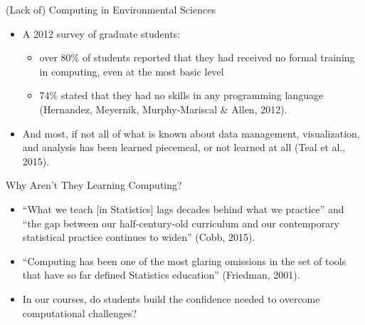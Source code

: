 \documentclass[10pt,ignorenonframetext,]{beamer}
\providecommand{\tightlist}{%
  \setlength{\itemsep}{0pt}\setlength{\parskip}{0pt}}
\begin{document}
\begin{frame}{(Lack of) Computing in Environmental Sciences}

\begin{itemize}[<+->]
\tightlist
\item
  A 2012 survey of graduate students:

  \begin{itemize}[<+->]
  \tightlist
  \item
    over 80\% of students reported that they had received no formal
    training in computing, even at the most basic level\\
  \item
    74\% stated that they had no skills in any programming language
    (Hernandez, Meyernik, Murphy-Mariscal \& Allen, 2012).
  \end{itemize}
\item
  And most, if not all of what is known about data management,
  visualization, and analysis has been learned piecemeal, or not learned
  at all (Teal et al., 2015).
\end{itemize}

\end{frame}

\begin{frame}{Why Aren't They Learning Computing?}

\begin{itemize}[<+->]
\item
  ``What we teach {[}in Statistics{]} lags decades behind what we
  practice'' and ``the gap between our half-century-old curriculum and
  our contemporary statistical practice continues to widen'' (Cobb,
  2015).
\item
  ``Computing has been one of the most glaring omissions in the set of
  tools that have so far defined Statistics education'' (Friedman,
  2001).
\item
  In our courses, do students build the confidence needed to overcome
  computational challenges?
\end{itemize}

\end{frame}
\end{document}
